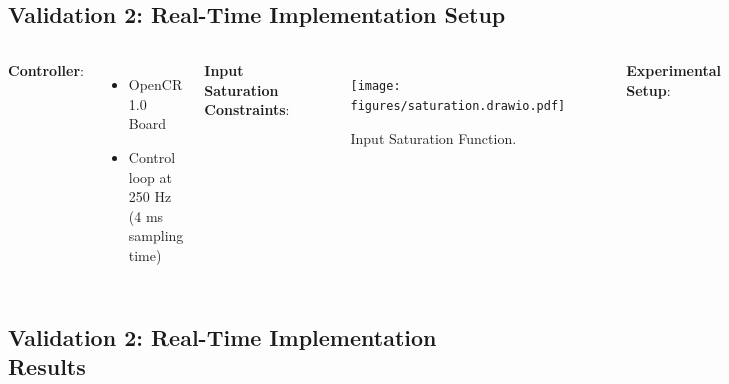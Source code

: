 \documentclass[8pt, aspectratio=169]{beamer}
\begin{document}
\subsection{Validation 2: Real-Time Implementation Setup}

\begin{frame}{\insertsubsectionhead}{}

  \begin{columns}
    

      \textbf{Controller}:
      
        \begin{itemize}
          \item OpenCR 1.0 Board
          \item Control loop at 250 Hz (4 ms sampling time)
        \end{itemize}

      \vspace{.2cm}

      \textbf{Input Saturation Constraints}:

        \begin{figure}
          \texttt{[image: figures/saturation.drawio.pdf]}
          \caption{Input Saturation Function.}
        \end{figure}
      

      \textbf{Experimental Setup}:

        \begin{figure}
          \texttt{[image: figures/exp\_set.drawio.png]}
          \caption{Experimental setup for real-time implementation.}
        \end{figure}
      
  \end{columns}

\end{frame}

\subsection{Validation 2: Real-Time Implementation Results}
\end{document}
